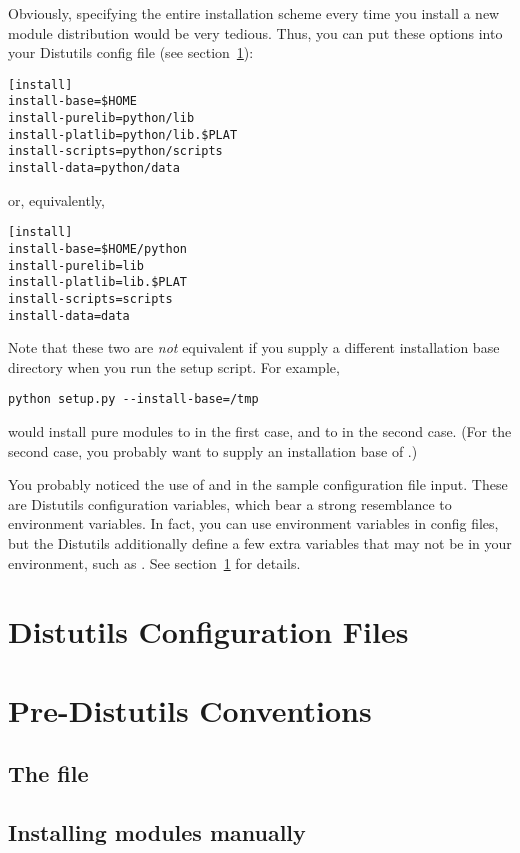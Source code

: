 \documentclass{howto}
\begin{document}
Obviously, specifying the entire installation scheme every time you
install a new module distribution would be very tedious.  Thus, you can
put these options into your Distutils config file (see
section~\ref{sec:config-files}):
\begin{verbatim}
[install]
install-base=$HOME
install-purelib=python/lib
install-platlib=python/lib.$PLAT
install-scripts=python/scripts
install-data=python/data
\end{verbatim}
or, equivalently,
\begin{verbatim}
[install]
install-base=$HOME/python
install-purelib=lib
install-platlib=lib.$PLAT
install-scripts=scripts
install-data=data
\end{verbatim}
Note that these two are \emph{not} equivalent if you supply a different
installation base directory when you run the setup script.  For example,
\begin{verbatim}
python setup.py --install-base=/tmp
\end{verbatim}
would install pure modules to  in the first
case, and to  in the second case.  (For the second
case, you probably want to supply an installation base of
.)

You probably noticed the use of  and  in the
sample configuration file input.  These are Distutils configuration
variables, which bear a strong resemblance to environment variables.  In
fact, you can use environment variables in config files, but the
Distutils additionally define a few extra variables that may not be in
your environment, such as .  See
section~\ref{sec:config-files} for details.



\section{Distutils Configuration Files}
\label{sec:config-files}

\comingsoon



\section{Pre-Distutils Conventions}
\label{sec:pre-distutils}


\subsection{The \protect{} file}
\label{sec:makefile-pre-in}


\subsection{Installing modules manually}
\label{sec:manual-install}
\end{document}
